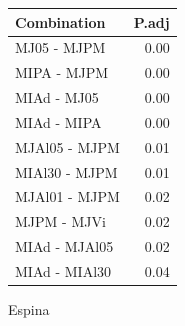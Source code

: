 \documentclass{beamer}\usepackage[]{graphicx}\usepackage[]{color}
\begin{document}
\begin{frame}
{\begin{minipage}{1.20\textwidth}
\begin{table}[htb]
\begin{multicols}{3}
\begin{minipage}{.2\textwidth}
{%
\begin{tabular}{lr}
  \hline
Combination & P.adj \\ 
  \hline
MJ05 - MJPM & 0.00 \\ 
  MIPA - MJPM & 0.00 \\ 
  MIAd - MJ05 & 0.00 \\ 
  MIAd - MIPA & 0.00 \\ 
  MJAl05 - MJPM & 0.01 \\ 
  MIAl30 - MJPM & 0.01 \\ 
  MJAl01 - MJPM & 0.02 \\ 
  MJPM - MJVi & 0.02 \\ 
  MIAd - MJAl05 & 0.02 \\ 
  MIAd - MIAl30 & 0.04 \\ 
   \hline
\end{tabular}

}
        \end{minipage}
        \begin{minipage}{.2\textwidth}
        \centering
        Espina
        \end{minipage}

      \vspace{1cm}


\end{multicols}
\end{table}
\end{minipage}}
\end{frame}
\end{document}
